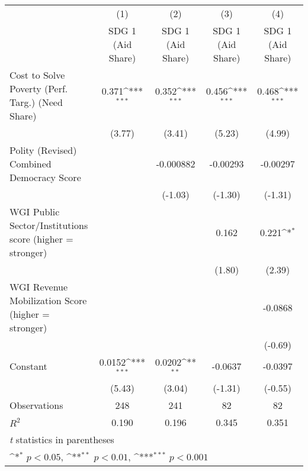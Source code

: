 {
\def\sym#1{\ifmmode^{#1}\else\(^{#1}\)\fi}
\begin{tabular}{l*{4}{c}}
\hline\hline
                &\multicolumn{1}{c}{(1)}&\multicolumn{1}{c}{(2)}&\multicolumn{1}{c}{(3)}&\multicolumn{1}{c}{(4)}\\
                &\multicolumn{1}{c}{SDG 1 (Aid Share)}&\multicolumn{1}{c}{SDG 1 (Aid Share)}&\multicolumn{1}{c}{SDG 1 (Aid Share)}&\multicolumn{1}{c}{SDG 1 (Aid Share)}\\
\hline
Cost to Solve Poverty (Perf. Targ.) (Need Share)&    0.371\sym{***}&    0.352\sym{***}&    0.456\sym{***}&    0.468\sym{***}\\
                &   (3.77)         &   (3.41)         &   (5.23)         &   (4.99)         \\
[1em]
Polity (Revised) Combined Democracy Score&                  &-0.000882         & -0.00293         & -0.00297         \\
                &                  &  (-1.03)         &  (-1.30)         &  (-1.31)         \\
[1em]
WGI Public Sector/Institutions score (higher = stronger)&                  &                  &    0.162         &    0.221\sym{*}  \\
                &                  &                  &   (1.80)         &   (2.39)         \\
[1em]
WGI Revenue Mobilization Score (higher = stronger)&                  &                  &                  &  -0.0868         \\
                &                  &                  &                  &  (-0.69)         \\
[1em]
Constant        &   0.0152\sym{***}&   0.0202\sym{**} &  -0.0637         &  -0.0397         \\
                &   (5.43)         &   (3.04)         &  (-1.31)         &  (-0.55)         \\
\hline
Observations    &      248         &      241         &       82         &       82         \\
\(R^{2}\)       &    0.190         &    0.196         &    0.345         &    0.351         \\
\hline\hline
\multicolumn{5}{l}{\footnotesize \textit{t} statistics in parentheses}\\
\multicolumn{5}{l}{\footnotesize \sym{*} \(p<0.05\), \sym{**} \(p<0.01\), \sym{***} \(p<0.001\)}\\
\end{tabular}
}
